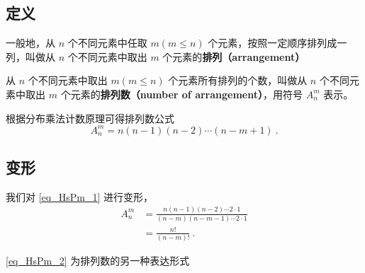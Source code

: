 
\begin{issues}
\end{issues}


\subsection{定义}
一般地，从 $n$ 个不同元素中任取 $m(m \leq n)$ 个元素，按照一定顺序排列成一列，叫做从 $n$ 个不同元素中取出 $m$ 个元素的\textbf{排列（arrangement）}

从 $n$ 个不同元素中取出 $m(m \leq n)$ 个元素所有排列的个数，叫做从 $n$ 个不同元素中取出 $m$ 个元素的\textbf{排列数（number of arrangement）}，用符号 $A_n^m$ 表示。

根据分布乘法计数原理可得排列数公式\begin{equation}\label{eq_HsPm_1}
A_n^m = n (n - 1)(n - 2) \cdots (n - m + 1)~.
\end{equation}

\subsection{变形}
我们对 \autoref{eq_HsPm_1} 进行变形，\begin{equation}\label{eq_HsPm_2}
\begin{aligned}
A_n^m &= \frac{n(n - 1)(n - 2) \cdots 2 \cdot 1}{(n - m)(n - m - 1) \cdots 2 \cdot 1}\\
&= \frac{n!}{(n - m)!}~.
\end{aligned}
\end{equation}

\autoref{eq_HsPm_2} 为排列数的另一种表达形式
